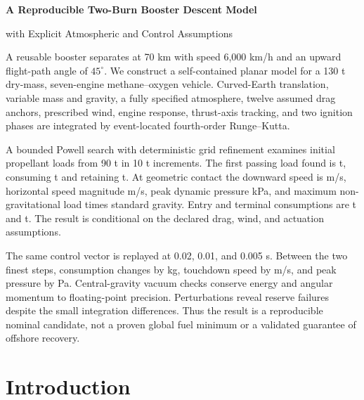 \documentclass[11pt,a4paper]{article}
\begin{document}
\hypersetup{pageanchor=false}\thispagestyle{fancy}
\begin{center}\vspace*{6mm}
{\LARGE\bfseries A Reproducible Two-Burn Booster Descent Model\par with Explicit Atmospheric and Control Assumptions\par}
\vspace{5mm}{\large Team 856, Problem A\par}\vspace{6mm}{\large\bfseries Abstract\par}
\end{center}
\noindent
A reusable booster separates at 70 km with speed 6,000 km/h and an upward flight-path angle of $45^\circ$. We construct a self-contained planar model for a 130 t dry-mass, seven-engine methane--oxygen vehicle. Curved-Earth translation, variable mass and gravity, a fully specified atmosphere, twelve assumed drag anchors, prescribed wind, engine response, thrust-axis tracking, and two ignition phases are integrated by event-located fourth-order Runge--Kutta.

A bounded Powell search with deterministic grid refinement examines initial propellant loads from 90 t in 10 t increments. The first passing load found is \RLoad{} t, consuming \RUsed{} t and retaining \RReserve{} t. At geometric contact the downward speed is \RWf{} m/s, horizontal speed magnitude \RUf{} m/s, peak dynamic pressure \RQmax{} kPa, and maximum non-gravitational load \RNmax{} times standard gravity. Entry and terminal consumptions are \REntryFuel{} t and \RTerminalFuel{} t. The result is conditional on the declared drag, wind, and actuation assumptions.

The same control vector is replayed at 0.02, 0.01, and 0.005 s. Between the two finest steps, consumption changes by \RFineDm{} kg, touchdown speed by \RFineDv{} m/s, and peak pressure by \RFineDq{} Pa. Central-gravity vacuum checks conserve energy and angular momentum to floating-point precision. Perturbations reveal reserve failures despite the small integration differences. Thus the result is a reproducible nominal candidate, not a proven global fuel minimum or a validated guarantee of offshore recovery.
\clearpage\hypersetup{pageanchor=true}\clearpage{}

\section{Introduction}
\end{document}

